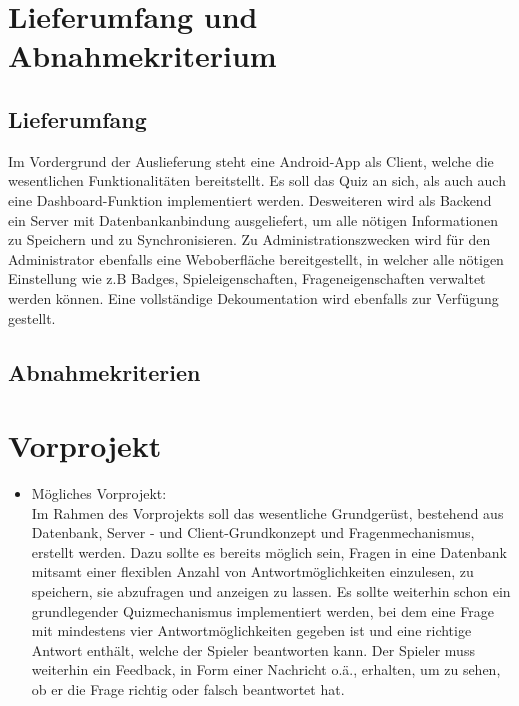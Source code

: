 \documentclass[11pt,a4paper]{scrreprt}
\begin{document}
\chapter{Lieferumfang und Abnahmekriterium}
\section{Lieferumfang}
Im Vordergrund der Auslieferung steht eine Android-App als Client, welche die wesentlichen Funktionalitäten bereitstellt. Es soll das Quiz an sich, als auch auch eine Dashboard-Funktion implementiert werden. Desweiteren wird als Backend ein Server mit Datenbankanbindung ausgeliefert, um alle nötigen Informationen zu Speichern und zu Synchronisieren. Zu Administrationszwecken wird für den Administrator ebenfalls eine Weboberfläche bereitgestellt, in welcher alle nötigen Einstellung wie z.B Badges, Spieleigenschaften, Frageneigenschaften verwaltet werden können. Eine vollständige Dekoumentation wird ebenfalls zur Verfügung gestellt.
\section{Abnahmekriterien}

	
\chapter{Vorprojekt}
\begin{itemize}
\item Mögliches Vorprojekt: \\
Im Rahmen des Vorprojekts soll das wesentliche Grundgerüst, bestehend aus Datenbank, Server - und Client-Grundkonzept und Fragenmechanismus, erstellt werden. Dazu sollte es bereits möglich sein, Fragen in eine Datenbank mitsamt einer flexiblen Anzahl von Antwortmöglichkeiten einzulesen, zu speichern, sie abzufragen und anzeigen zu lassen. Es sollte weiterhin schon ein grundlegender Quizmechanismus implementiert werden, bei dem eine Frage mit mindestens vier Antwortmöglichkeiten gegeben ist und eine richtige Antwort enthält, welche der Spieler beantworten kann. Der Spieler muss weiterhin ein Feedback, in Form einer Nachricht o.ä., erhalten, um zu sehen, ob er die Frage richtig oder falsch beantwortet hat.
\end{itemize}
\end{document}
